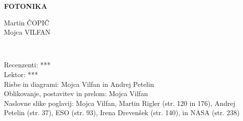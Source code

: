 \documentclass[11pt,fleqn]{book} %
\begin{document}
\let\cleardoublepage\clearpage
\makeatletter
\setlength{\@fptop}{0pt}
\makeatother




\begingroup
\thispagestyle{empty}
\centering
\vspace*{5cm}
\par\normalfont\fontsize{35}{35}\sffamily\selectfont
\textbf{FOTONIKA}\\
{\LARGE }\par %
\vspace*{1cm}
\vspace*{1cm}
\vspace*{8cm}
{\Large Martin ČOPIČ \\Mojca VILFAN \\}\par %
\endgroup


\newpage
~\vfill
\thispagestyle{empty}


 Recenzenti: {***}\\ %

 Lektor: {***}\\ %

 Risbe in diagrami: Mojca Vilfan in Andrej Petelin\\ %
 
 Oblikovanje, postavitev in prelom: Mojca Vilfan \\ %

 Naslovne slike poglavij: Mojca Vilfan, Martin Rigler (str. 120 in 176), Andrej Petelin (str. 37),
 ESO (str. 93), Irena Drevenšek (str. 140), in NASA (str. 238)\\ %
\end{document}
